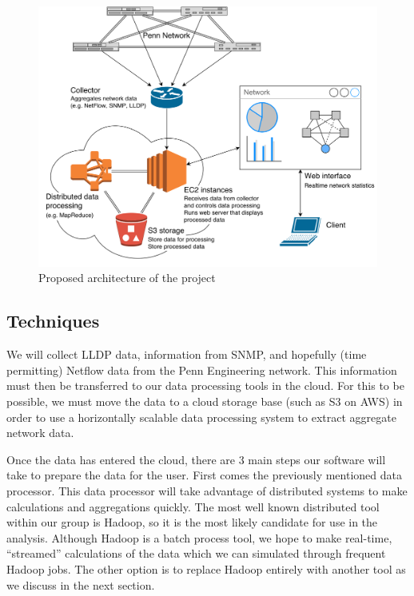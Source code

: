 \documentclass{sig-alternate}
\begin{document}
\begin{figure}[htb!]
    \centering
    \includegraphics[width=\linewidth]{mockup}
    \caption{Proposed architecture of the project}
    \label{fig:mockup}
\end{figure}

\subsection{Techniques}

We will collect LLDP data, information from SNMP, and hopefully (time
permitting) Netflow data from the Penn Engineering network. This information
must then be transferred to our data processing tools in the cloud. For this to
be possible, we must move the data to a cloud storage base (such as S3 on AWS)
in order to use a horizontally scalable data processing system to extract
aggregate network data.

Once the data has entered the cloud, there are 3 main steps our software will
take to prepare the data for the user. First comes the previously mentioned data
processor. This data processor will take advantage of distributed systems to
make calculations and aggregations quickly. The most well known distributed tool
within our group is Hadoop, so it is the most likely candidate for use in the
analysis. Although Hadoop is a batch process tool, we hope to make real-time,
``streamed'' calculations of the data which we can simulated through frequent
Hadoop jobs. The other option is to replace Hadoop entirely with another tool as
we discuss in the next section.
\end{document}
